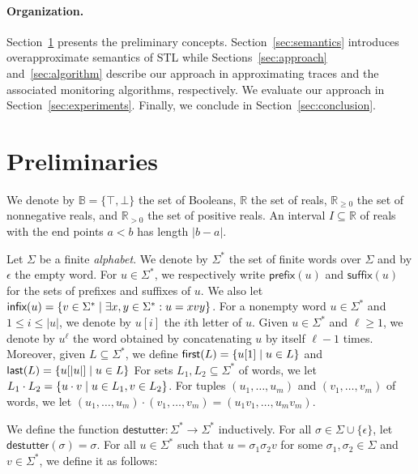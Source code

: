 \documentclass[iicol,lineno]{sn-jnl}
\renewcommand{\pfx}{\textsf{prefix}}
\newcommand{\first}{\textsf{first}}
\newcommand{\last}{\textsf{last}}
\renewcommand{\sfx}{\textsf{suffix}}
\newcommand{\infx}{\textsf{infix}}
\newcommand{\destutter}{\mathsf{destutter}}
\newcommand{\R}{\mathbb{R}}
\newcommand{\B}{\mathbb{B}}
\newcommand{\?}{\text{?}}
\newcommand{\suchthat}{\;\ifnum\currentgrouptype=16 \middle\fi|\;}
\let\st\suchthat
\begin{document}
	\paragraph{Organization.}
	Section~\ref{sec:preliminaries} presents the preliminary concepts.
	Section~\ref{sec:semantics} introduces overapproximate semantics of STL while Sections~\ref{sec:approach} and~\ref{sec:algorithm} describe our approach in approximating traces and the associated monitoring algorithms, respectively.
	We evaluate our approach in Section~\ref{sec:experiments}.
	Finally, we conclude in Section~\ref{sec:conclusion}.
	
	
	\section{Preliminaries} \label{sec:preliminaries}
	
	We denote by $\B = \{ \top, \bot \}$ the set of Booleans, $\R$ the set of reals, $\R_{\geq 0}$ the set of nonnegative reals, and $\R_{> 0}$ the 
	set of positive reals.
	An interval $I \subseteq \R$ of reals with the end points $a < b$ has length $|b-a|$.
	
	Let $\Sigma$ be a finite {\em alphabet}.
	We denote by $\Sigma^*$ the set of finite words over $\Sigma$ and by $\epsilon$ the empty word.
	For $u \in \Sigma^*$, we respectively write $\pfx(u)$ and $\sfx(u)$ for the sets of prefixes 
	and suffixes of $u$.
	We also let $\infx(u) = \{v \in \Sigma^* \st \exists x,y \in \Sigma^* : u = xvy\}$.
	For a nonempty word $u \in \Sigma^*$ and $1 \leq i \leq |u|$, we denote by $u[i]$ the $i$th letter of $u$.
	Given $u \in \Sigma^*$ and $\ell \geq 1$, we denote by $u^\ell$ the word obtained by concatenating $u$ by itself $\ell - 1$ times.
	Moreover, given $L \subseteq \Sigma^*$, we define $\first(L) = \{ u[1] \st u \in L\}$ and $\last(L) = \{ u[|u|] \st u \in L\}$
	For sets $L_1, L_2 \subseteq \Sigma^*$ of words, we let $L_1 \cdot L_2 = \{u \cdot v \st u \in L_1, v \in L_2\}$.
	For tuples $(u_1, \ldots, u_m)$ and $(v_1, \ldots, v_m)$ of words, we let $(u_1, \ldots, u_m) \cdot (v_1, \ldots, v_m) = (u_1 v_1, \ldots, u_m v_m)$.
	
	We define the function $\destutter : \Sigma^* \to \Sigma^*$ inductively.
	For all $\sigma \in \Sigma \cup \{\epsilon\}$, let $\destutter(\sigma) = \sigma$.
	For all $u \in \Sigma^*$ such that $u = \sigma_1 \sigma_2 v$ for some $\sigma_1,\sigma_2 \in 
	\Sigma$ and $v \in \Sigma^*$, we define it as follows:
	
\end{document}

